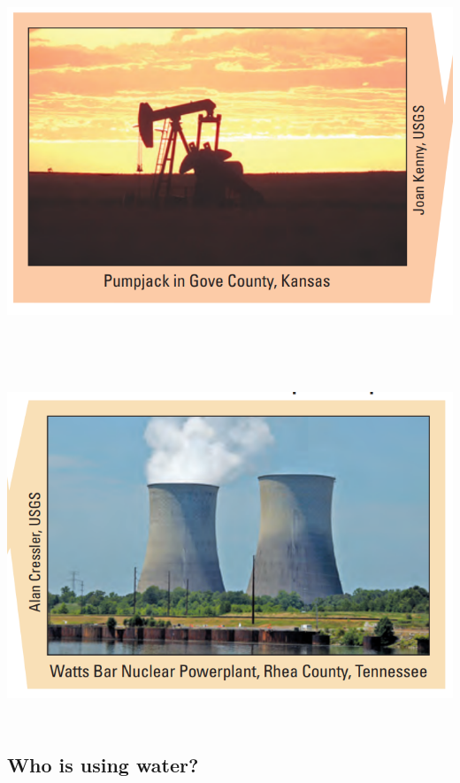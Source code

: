 \documentclass[]{article}
\begin{document}
\includegraphics[width=\textwidth,height=4.16667in]{figures/m10_mining.png}

\hypertarget{section-21}{%
\subsection{}\label{section-21}}

\includegraphics[width=\textwidth,height=4.16667in]{figures/m10_thermal.png}

\hypertarget{who-is-using-water-1}{%
\subsection{Who is using water?}\label{who-is-using-water-1}}
\end{document}
